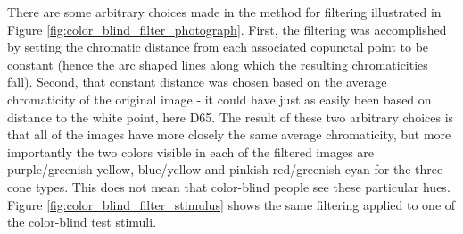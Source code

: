 \documentclass[twocolumn]{article}
\newif\ifinvert
\begin{document}
There are some arbitrary choices made in the method for filtering illustrated in Figure \ref{fig:color_blind_filter_photograph}.  First, the filtering was accomplished by setting the chromatic distance from each associated copunctal point to be constant (hence the arc shaped lines along which the resulting chromaticities fall).  Second, that constant distance was chosen based on the average chromaticity of the original image - it could have just as easily been based on distance to the white point, here D65.  The result of these two arbitrary choices is that all of the images have more closely the same average chromaticity, but more importantly the two colors visible in each of the filtered images are purple/greenish-yellow, blue/yellow and pinkish-red/greenish-cyan for the three cone types.  This does not mean that color-blind people see these particular hues.  Figure \ref{fig:color_blind_filter_stimulus} shows the same filtering applied to one of the color-blind test stimuli.
\begin{figure*}[h]
    \ifinvert
        
    \else
        
    \fi
    \caption{A color-blind test stimulus (protanope) filtered to remove chromatic differences to which an observer with a missing cone type would not be sensitive.  From left-to-right are the original image, a protanope filtered image, a deuteranope filtered image, and a tritanope filtered image.  Below each image is a chromaticity diagram showing the distribution of chromaticities in the image.  Note that in the second image from the left (filtered to mimic the chromatic discriminability of a protanope) the "C" figure is invisible (the distribution is a more-or-less uniform point).  IMAGE LINK, CODE LINK}\label{fig:color_blind_filter_stimulus}
\end{figure*}
\twocolumn[{\printbibliography}]
\end{document}

